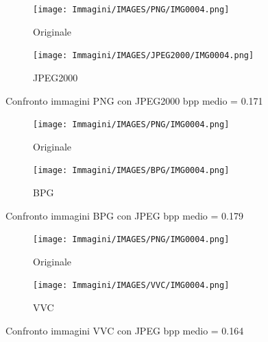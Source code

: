 \begin{figure}
    \centering
    \begin{subfigure}[t]{0.3\textwidth}
        \texttt{[image: Immagini/IMAGES/PNG/IMG0004.png]}
        \caption{Originale}
        \label{fig:OriginalJPEG2000}
    \end{subfigure}
    \hspace*{1.5cm}
    \begin{subfigure}[t]{0.3\textwidth}
        \texttt{[image: Immagini/IMAGES/JPEG2000/IMG0004.png]}
        \caption{JPEG2000}
        \label{fig:CompressedJPEG2000}
    \end{subfigure}
    \caption{Confronto immagini PNG con JPEG2000 bpp medio = 0.171}
    \label{fig:CompressionJPEG2000}
\end{figure}

\begin{figure}
    \centering
    \begin{subfigure}[t]{0.3\textwidth}
        \texttt{[image: Immagini/IMAGES/PNG/IMG0004.png]}
        \caption{Originale}
        \label{fig:OriginalBPG}
    \end{subfigure}
    \hspace*{1.5cm}
    \begin{subfigure}[t]{0.3\textwidth}
        \texttt{[image: Immagini/IMAGES/BPG/IMG0004.png]}
        \caption{BPG}
        \label{fig:CompressedBPG}
    \end{subfigure}
    \caption{Confronto immagini BPG con JPEG bpp medio = 0.179}
    \label{fig:CompressionBPG}
\end{figure}

\begin{figure}
    \centering
    \begin{subfigure}[t]{0.3\textwidth}
        \texttt{[image: Immagini/IMAGES/PNG/IMG0004.png]}
        \caption{Originale}
        \label{fig:OriginalVVC}
    \end{subfigure}
    \hspace*{1.5cm}
    \begin{subfigure}[t]{0.3\textwidth}
        \texttt{[image: Immagini/IMAGES/VVC/IMG0004.png]}
        \caption{VVC}
        \label{fig:CompressedVVC}
    \end{subfigure}
    \caption{Confronto immagini VVC con JPEG bpp medio = 0.164}
    \label{fig:CompressionVVC}
\end{figure}
